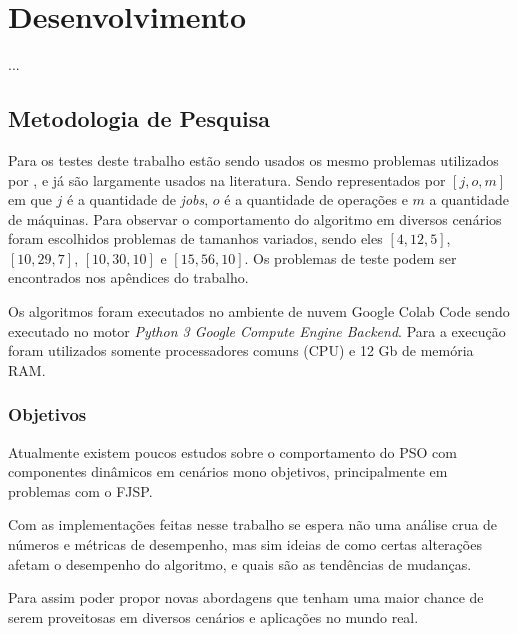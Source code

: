 \chapter{Desenvolvimento}
    ...


\section{Metodologia de Pesquisa}
        Para os testes deste trabalho estão sendo usados os mesmo problemas utilizados por \cite{Kacem2002}, e já são largamente usados na literatura. Sendo representados por $[j, o, m]$ em que $j$ é a quantidade de \textit{jobs}, $o$ é a quantidade de operações e $m$ a quantidade de máquinas. Para observar o comportamento do algoritmo em diversos cenários foram escolhidos problemas de tamanhos variados, sendo eles $[4, 12, 5]$, $[10, 29, 7]$, $[10, 30, 10]$ e $[15, 56, 10]$. Os problemas de teste podem ser encontrados nos apêndices do trabalho.\newline

        Os algoritmos foram executados no ambiente de nuvem Google Colab Code sendo executado no motor \textit{Python 3 Google Compute Engine Backend}. Para a execução foram utilizados somente processadores comuns (CPU) e 12 Gb de memória RAM.

    \subsection{Objetivos}
        Atualmente existem poucos estudos sobre o comportamento do PSO com componentes dinâmicos em cenários mono objetivos, principalmente em problemas com o FJSP. \newline

        Com as implementações feitas nesse trabalho se espera não uma análise crua de números e métricas de desempenho, mas sim ideias de como certas alterações afetam o desempenho do algoritmo, e quais são as tendências de mudanças. \newline
        
        Para assim poder propor novas abordagens que tenham uma maior chance de serem proveitosas em diversos cenários e aplicações no mundo real.


